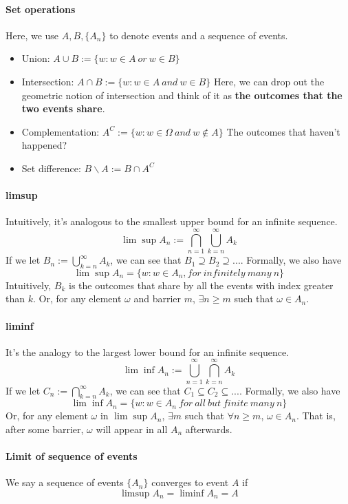 \documentclass[11pt]{report}
\begin{document}
\paragraph{Set operations} Here, we use $A,B,\{A_n\}$ to denote events and a sequence of events.
\begin{itemize}
	\item Union: $A\cup B := \{w:w\in A\ or\ w\in B \}$
	\item Intersection: $A\cap B := \{w:w\in A\ and\ w\in B \}$
	Here, we can drop out the geometric notion of intersection and think of it as {\bf the outcomes that the two events share}.
	\item Complementation: $A^C:=\{w:w\in\Omega\ and\ w\notin A \}$
	The outcomes that haven't happened?
	\item Set difference: $B\backslash A:= B\cap A^C$
\end{itemize}

\paragraph{limsup}
Intuitively, it's analogous to the smallest upper bound for an infinite sequence.
$$\lim\sup A_n := \bigcap_{n=1}^{\infty}\bigcup_{k=n}^{\infty} A_k$$
If we let $B_n:=\bigcup_{k=n}^{\infty} A_k$, we can see that $B_1\supseteq B_2\supseteq...$. Formally, we also have
$$\lim\sup A_n = \{w:w\in A_n, for\ infinitely\ many\ n \}$$
Intuitively, $B_k$ is the outcomes that share by all the events with index greater than $k$.
Or, for any element $\omega$ and barrier $m$, $\exists n\geq m$ such that $\omega\in A_n$.

\paragraph{liminf}
It's the analogy to the largest lower bound for an infinite sequence.
$$\lim\inf A_n:= \bigcup_{n=1}^{\infty}\bigcap_{k=n}^{\infty} A_k$$
If we let $C_n:= \bigcap_{k=n}^{\infty} A_k$, we can see that $C_1\subseteq C_2\subseteq...$. Formally, we also have
$$\lim\inf A_n=\{w:w\in A_n\ for\ all\ but\ finite\ many\ n \}$$
Or, for any element $\omega$ in $\lim\sup A_n$, $\exists m$ such that $\forall n\geq m$, $\omega\in A_n$. That is, after some barrier, $\omega$ will appear in all $A_n$ afterwards.

\paragraph{Limit of sequence of events}
We say a sequence of events $\{A_n\}$ converges to event $A$ if 
$$\limsup A_n=\liminf A_n = A$$
\end{document}
